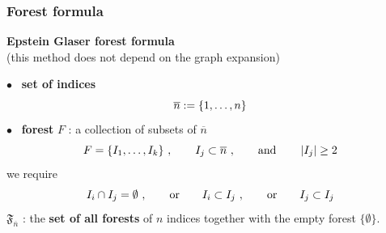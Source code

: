 \documentclass[9pt]{beamer}
\newcommand{\abs}[1]{\left|{#1}\right|}
\begin{document}
\begin{frame}[label=details_forest]

\frametitle{Forest formula}

\vfill

\textbf{Epstein Glaser forest formula}\\
\hspace*{5pt} (this method does not depend on the graph expansion)

$\bullet$ \ \textbf{set of indices}
%
\vspace*{-5pt}
\begin{equation*}
\overline{n} := \{1,\dots , n\}
\vspace*{-5pt}
\end{equation*}
%
$\bullet$ \ \textbf{forest} $F$ : a collection of subsets of $\overline{n}$ 
%
\vspace*{-5pt}
\begin{equation*}
F = \{ I_1,\dots, I_k\} \ , \qquad I_j \subset \overline{n} \ , \qquad \mbox{and} \qquad \abs{I_j} \geq 2
\vspace*{-5pt}
\end{equation*}
%
we require
%
\vspace*{-5pt}
\begin{equation*}
I_i\cap I_j = \emptyset \ , \qquad \text{or} \qquad I_i \subset I_j \ , \qquad \mbox{or} \qquad  I_j\subset I_j
\vspace*{-5pt}
\end{equation*}
%
$\mathfrak{F}_{\overline{n}}$ : the \textbf{set of all forests} of $n$ indices together with the empty forest $\{\emptyset\}$.

\vfill

\hfill\hyperlink{forest}{}
 
\end{frame}

\end{document}
